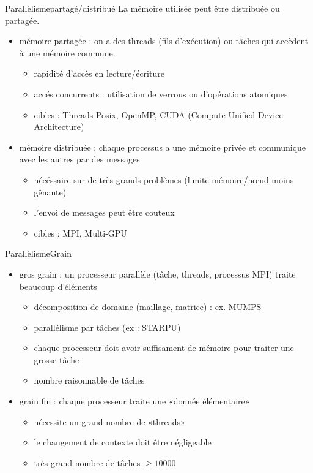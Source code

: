 \documentclass[11pt,mathserif]{beamer}
\newcommand{\hand}{\faHandORight}
\newcommand{\argi}{\faLightbulbO}
\newcommand{\kontuz}{\faExclamationTriangle}
\newcommand{\pozik}{\faSmileO}
\newcommand{\triste}{\faFrownO}
\begin{document}
\begin{frame}{Parallèlisme}{partagé/distribué}
\pause
La mémoire utilisée peut être distribuée ou partagée.
  \begin{itemize}[<+->]
    \item mémoire partagée : on a des threads (fils d'exécution) ou tâches qui accèdent à une mémoire commune. 
      \begin{itemize}
        \item[\pozik] rapidité d'accès en lecture/écriture
        \item[\kontuz] accés concurrents : utilisation de verrous ou d'opérations atomiques
        \item[\argi] cibles : Threads Posix, OpenMP, CUDA (Compute Unified Device Architecture)
      \end{itemize}
    \item mémoire distribuée : chaque processus a une mémoire privée et communique avec les autres par des messages
      \begin{itemize}
        \item[\argi] nécéssaire sur de très grands problèmes (limite mémoire/nœud moins gênante)
        \item[\triste] l'envoi de messages peut être couteux
        \item[\argi] cibles : MPI, Multi-GPU
      \end{itemize}
  \end{itemize}
\end{frame}

\begin{frame}{Parallèlisme}{Grain}
\begin{itemize}[<+->]
  \item[\faTruck] gros grain : un processeur parallèle (tâche, threads, processus MPI) traite beaucoup d'éléments 
   \begin{itemize}
     \item décomposition de domaine (maillage, matrice) :  ex. MUMPS
     \item parallélisme par tâches (ex : STARPU)
     \item[\hand] chaque processeur doit avoir suffisament de mémoire pour traiter une grosse tâche
     \item[\argi] nombre raisonnable de tâches
   \end{itemize}
 \item[\faBicycle] grain fin : chaque processeur traite une «donnée élémentaire»
   \begin{itemize}
     \item[\hand] nécessite un grand nombre de «threads»
     \item[\hand] le changement de contexte doit être négligeable
     \item[\argi] très grand nombre de tâches $\geqslant 10000$
   \end{itemize}
\end{itemize}
\end{frame}
\end{document}
